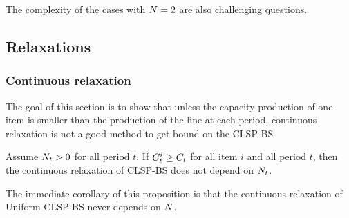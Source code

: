The complexity of the cases with $N=2$ are also challenging questions.




\subsection{Relaxations}
\label{sec:PDP:deterministic:theoretical-results:continuous-relaxation}

\subsubsection{Continuous relaxation}

The goal of this section is to show that unless the capacity production of one item is smaller than the production of the line at each period, continuous relaxation is not a good method to get bound on the CLSP-BS





\begin{prop}\label{prop:relaxation-independant-N}
Assume $N_t>0$ for all period $t$.
If $C_t^i\ge C_t$ for all item $i$ and all period $t$, then the continuous relaxation of CLSP-BS does not depend on $N_t$.
\end{prop}

The immediate corollary of this proposition is that the continuous relaxation of Uniform CLSP-BS never depends on $N$.


